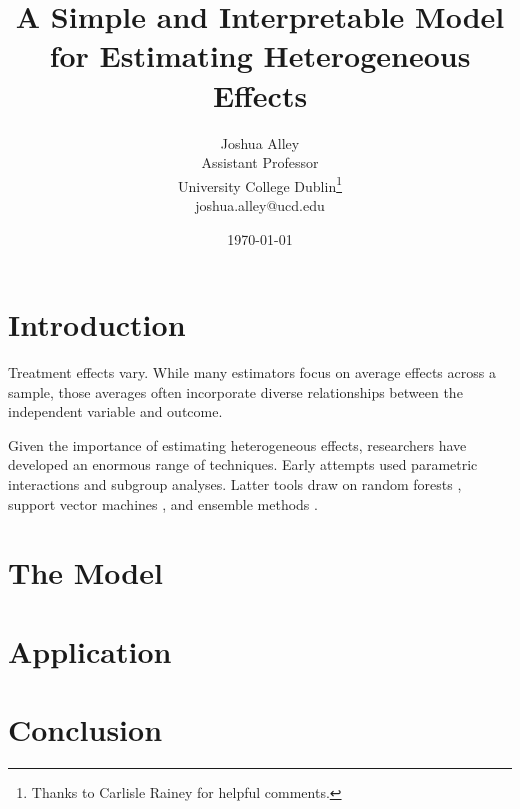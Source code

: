 \documentclass[12pt]{article}
\title{\textbf{A Simple and Interpretable Model for Estimating Heterogeneous Effects}}
\author{Joshua Alley \\
Assistant Professor \\
University College Dublin\thanks{Thanks to Carlisle Rainey for helpful comments.} \\
joshua.alley@ucd.edu
}
\date{\today}
\begin{document}
\maketitle 

\begin{abstract} 

\end{abstract} 


\newpage 
\doublespace 


\section{Introduction}


Treatment effects vary.
While many estimators focus on average effects across a sample, those averages often incorporate diverse relationships between the independent variable and outcome. 


Given the importance of estimating heterogeneous effects, researchers have developed an enormous range of techniques. 
Early attempts used parametric interactions and subgroup analyses. 
Latter tools draw on random forests \citep{GreenKern2012, WagerAthey2018}, support vector machines \citep{ImaiRatkovic2013}, and ensemble methods \citep{Grimmeretal2017, Kunzeletal2019}. 



\section{The Model}




\section{Application} 



\section{Conclusion}


\newpage
\singlespace
 
 
\end{document}
